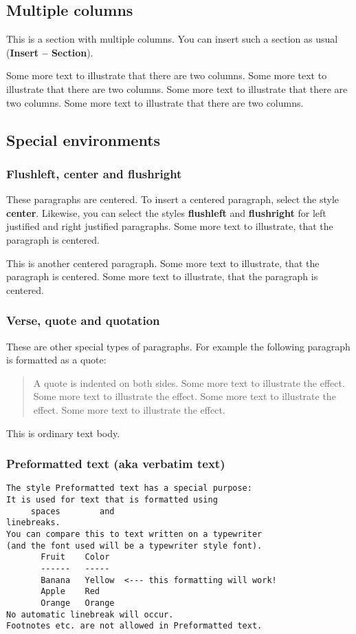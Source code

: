 \documentclass[12pt]{article}
\begin{document}
\subsection{Multiple columns}
\begin{multicols}{2}
This is a section with multiple columns. You can insert such a section
as usual (\textbf{Insert {--} Section}).

Some more text to illustrate that there are two columns. Some more text
to illustrate that there are two columns. Some more text to illustrate
that there are two columns. Some more text to illustrate that there are
two columns.
\end{multicols}
\subsection{Special environments}
\subsubsection{Flushleft, center and flushright}
\begin{center}
These paragraphs are centered. To insert a centered paragraph, select
the style \textbf{center}. Likewise, you can select the styles
\textbf{flushleft} and \textbf{flushright} for left justified and right
justified paragraphs. Some more text to illustrate, that the paragraph
is centered.

This is another centered paragraph. Some more text to illustrate, that
the paragraph is centered. Some more text to illustrate, that the
paragraph is centered.

\end{center}
\subsubsection{Verse, quote and quotation}
These are other special types of paragraphs. For example the following
paragraph is formatted as a quote:

\begin{quote}
A quote is indented on both sides. Some more text to illustrate the
effect. Some more text to illustrate the effect. Some more text to
illustrate the effect. Some more text to illustrate the effect.

\end{quote}
This is ordinary text body.

\subsubsection{Preformatted text (aka verbatim text)}
\begin{verbatim}
The style Preformatted text has a special purpose:
It is used for text that is formatted using
     spaces        and
linebreaks.
You can compare this to text written on a typewriter
(and the font used will be a typewriter style font).
       Fruit    Color
       ------   -----
       Banana   Yellow  <--- this formatting will work!
       Apple    Red
       Orange   Orange
No automatic linebreak will occur.
Footnotes etc. are not allowed in Preformatted text.
\end{verbatim}
\end{document}
